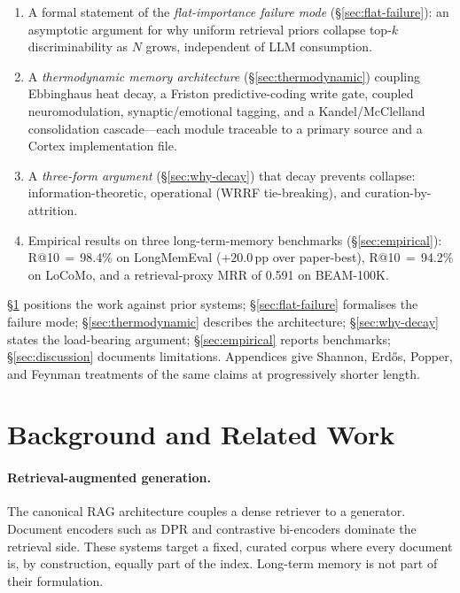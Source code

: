 \documentclass[11pt]{article}
\begin{document}
\begin{enumerate}
  \item A formal statement of the \emph{flat-importance failure
        mode} (\S\ref{sec:flat-failure}): an asymptotic argument
        for why uniform retrieval priors collapse top-$k$
        discriminability as $N$ grows, independent of LLM
        consumption.
  \item A \emph{thermodynamic memory architecture}
        (\S\ref{sec:thermodynamic}) coupling Ebbinghaus heat decay,
        a Friston predictive-coding write gate, coupled
        neuromodulation, synaptic/emotional tagging, and a
        Kandel/McClelland consolidation cascade---each module
        traceable to a primary source and a Cortex implementation
        file.
  \item A \emph{three-form argument} (\S\ref{sec:why-decay}) that
        decay prevents collapse: information-theoretic, operational
        (WRRF tie-breaking), and curation-by-attrition.
  \item Empirical results on three long-term-memory benchmarks
        (\S\ref{sec:empirical}): R@10\,$=$\,98.4\% on LongMemEval
        ($+20.0$\,pp over paper-best), R@10\,$=$\,94.2\% on LoCoMo,
        and a retrieval-proxy MRR of 0.591 on BEAM-100K.
\end{enumerate}

\S\ref{sec:related} positions the work against prior systems;
\S\ref{sec:flat-failure} formalises the failure mode;
\S\ref{sec:thermodynamic} describes the architecture;
\S\ref{sec:why-decay} states the load-bearing argument;
\S\ref{sec:empirical} reports benchmarks;
\S\ref{sec:discussion} documents limitations.  Appendices give
Shannon, Erd\H{o}s, Popper, and Feynman treatments of the same
claims at progressively shorter length.

\section{Background and Related Work}
\label{sec:related}

\paragraph{Retrieval-augmented generation.}
The canonical RAG architecture \citep{Lewis2020} couples a dense
retriever to a generator.  Document encoders such as DPR
\citep{Karpukhin2020} and contrastive bi-encoders dominate the
retrieval side.  These systems target a fixed, curated corpus where
every document is, by construction, equally part of the index.
Long-term memory is not part of their formulation.
\end{document}
